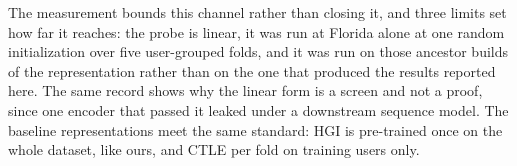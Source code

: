 The measurement bounds this channel rather than closing it, and three limits set how far it reaches: the probe is linear, it was run at Florida alone at one random initialization over five user-grouped folds, and it was run on those ancestor builds of the representation rather than on the one that produced the results reported here. The same record shows why the linear form is a screen and not a proof, since one encoder that passed it leaked under a downstream sequence model. The baseline representations meet the same standard: HGI is pre-trained once on the whole dataset, like ours, and CTLE per fold on training users only.


